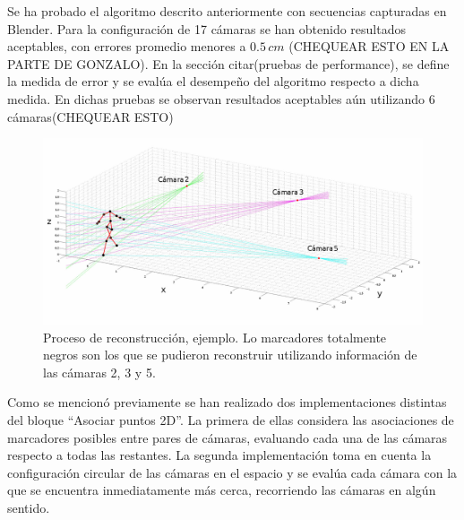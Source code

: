 Se ha probado el algoritmo descrito anteriormente con secuencias capturadas en Blender. Para la configuración de 17 cámaras se han obtenido resultados aceptables,  con errores promedio menores a $0.5\,cm$ (CHEQUEAR ESTO EN LA PARTE DE GONZALO). En la sección citar(pruebas de performance), se define la medida de error  y se evalúa el desempeño del algoritmo respecto a dicha medida. En dichas pruebas se observan resultados aceptables aún utilizando 6 cámaras(CHEQUEAR ESTO)

\begin{figure}[h!]
\centering
\captionsetup{justification=centering,margin=2.8cm}
\includegraphics[scale=0.5]{img/Reconstruccion/Reconstruccion_3_camaras2.jpg}
\caption{Proceso de reconstrucción, ejemplo. Lo marcadores totalmente negros son los que se pudieron reconstruir utilizando información de las cámaras 2, 3 y 5.}
\end{figure}


Como se mencionó previamente se han realizado dos implementaciones distintas del bloque  “Asociar puntos 2D”. La primera de ellas considera las asociaciones de marcadores posibles entre pares de cámaras, evaluando cada una de las cámaras respecto a todas las restantes.  La segunda implementación toma en cuenta  la configuración circular de las cámaras en el espacio y se evalúa cada cámara con la que se encuentra inmediatamente más cerca,  recorriendo las cámaras en algún sentido.

